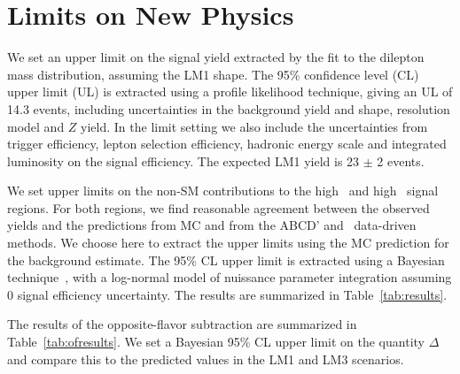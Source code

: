 \section{Limits on New Physics}
\label{sec:limit}

We set an upper limit on the signal yield extracted by the fit to the dilepton mass
distribution, assuming the LM1 shape. The 95\% confidence level (CL) upper limit (UL)
is extracted using a profile likelihood technique, giving an UL of 14.3 events, including
uncertainties in the background yield and shape, resolution model and $Z$ yield.
In the limit setting we also include the uncertainties from trigger efficiency,
lepton selection efficiency, hadronic energy scale and integrated luminosity on the signal efficiency.
The expected LM1 yield is 23 $\pm$ 2 events. 

We set upper limits on the non-SM contributions to the high \MET\ and high \Ht\ signal regions. 
For both regions, we find reasonable agreement between the observed yields and the predictions from MC and from the ABCD' and \ptll\
data-driven methods. We choose here to extract the upper limits using the MC prediction for the
background estimate. The 95\% CL upper limit is extracted using a Bayesian technique~\cite{ref:cl95cms}, 
with a log-normal model of nuissance parameter integration assuming 0 signal efficiency uncertainty. 
The results are summarized in Table~\ref{tab:results}. 

The results of the opposite-flavor subtraction are summarized in Table~\ref{tab:ofresults}.
We set a Bayesian 95\% CL upper limit on the quantity $\Delta$ and compare this to the predicted
values in the LM1 and LM3 scenarios.


